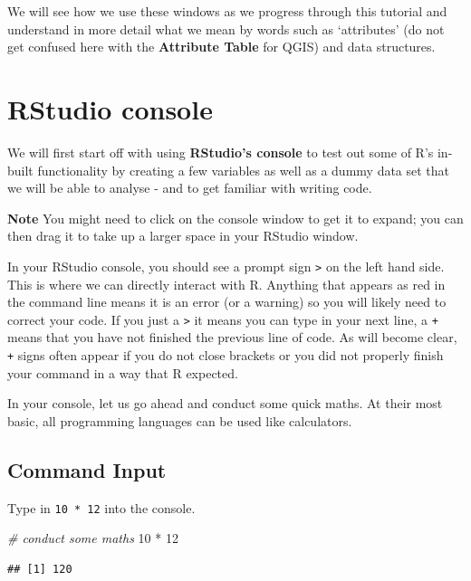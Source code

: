 \documentclass[
]{book}
\newenvironment{Shaded}{\begin{snugshade}}{\end{snugshade}}
\newcommand{\CommentTok}[1]{\textcolor[rgb]{0.56,0.35,0.01}{\textit{#1}}}
\newcommand{\DecValTok}[1]{\textcolor[rgb]{0.00,0.00,0.81}{#1}}
\newcommand{\SpecialCharTok}[1]{\textcolor[rgb]{0.00,0.00,0.00}{#1}}
\begin{document}
We will see how we use these windows as we progress through this tutorial and understand in more detail what we mean by words such as `attributes' (do not get confused here with the \textbf{Attribute Table} for QGIS) and data structures.

\hypertarget{rstudio-console}{%
\section{RStudio console}\label{rstudio-console}}

We will first start off with using \textbf{RStudio's console} to test out some of R's in-built functionality by creating a few variables as well as a dummy data set that we will be able to analyse - and to get familiar with writing code.

\textbf{Note}
You might need to click on the console window to get it to expand; you can then drag it to take up a larger space in your RStudio window.

In your RStudio console, you should see a prompt sign \texttt{\textgreater{}} on the left hand side. This is where we can directly interact with R. Anything that appears as red in the command line means it is an error (or a warning) so you will likely need to correct your code. If you just a \texttt{\textgreater{}} it means you can type in your next line, a \texttt{+} means that you have not finished the previous line of code. As will become clear, \texttt{+} signs often appear if you do not close brackets or you did not properly finish your command in a way that R expected.

In your console, let us go ahead and conduct some quick maths. At their most basic, all programming languages can be used like calculators.

\hypertarget{command-input}{%
\subsection{Command Input}\label{command-input}}

Type in \texttt{10\ *\ 12} into the console.

\begin{Shaded}
\begin{Highlighting}[]
\CommentTok{\# conduct some maths}
\DecValTok{10} \SpecialCharTok{*} \DecValTok{12}
\end{Highlighting}
\end{Shaded}

\begin{verbatim}
## [1] 120
\end{verbatim}
\end{document}
